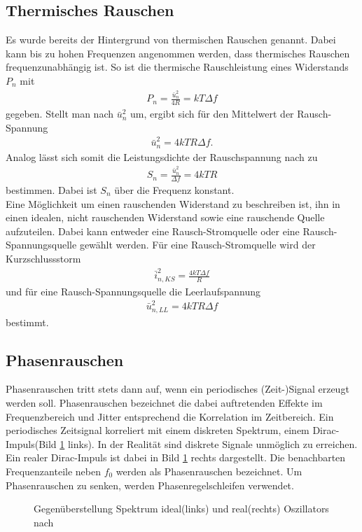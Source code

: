 \subsection{Thermisches Rauschen}
Es wurde bereits der Hintergrund von thermischen Rauschen genannt. Dabei kann bis zu hohen Frequenzen angenommen werden, dass thermisches Rauschen frequenzunabhängig ist. So ist die thermische Rauschleistung eines Widerstands $P_{n}$ mit
\begin{align}
P_{n} = \frac{\bar{u}_{n}^2}{4R} = kT\Delta f
\end{align}
gegeben. Stellt man nach $\bar{u}_{n}^2$ um, ergibt sich für den Mittelwert der Rausch-Spannung
\begin{align}
\bar{u}_{n}^2 = 4kTR\Delta f.
\end{align}
Analog lässt sich somit die Leistungsdichte der Rauschspannung nach \cite{Rauscherino} zu
\begin{align}
S_{n} = \frac{\bar{u}_{n}^2}{\Delta f} = 4kTR
\end{align}
bestimmen. Dabei ist $S_{n}$ über die Frequenz konstant. \\
Eine Möglichkeit um einen rauschenden Widerstand zu beschreiben ist, ihn in einen idealen, nicht rauschenden Widerstand sowie eine rauschende Quelle aufzuteilen. Dabei kann entweder eine Rausch-Stromquelle oder eine Rausch-Spannungsquelle gewählt werden. Für eine Rausch-Stromquelle wird der Kurzschlussstorm
\begin{align}
\bar{i}_{n,KS}^2 = \frac{4kT\Delta f}{R}
\end{align}
und für eine Rausch-Spannungsquelle die Leerlaufspannung
\begin{align}
\bar{u}_{n,LL}^2 = 4kTR\Delta f 
\end{align}
bestimmt\cite{HFKompo}.
\subsection{Phasenrauschen}
Phasenrauschen tritt stets dann auf, wenn ein periodisches (Zeit-)Signal erzeugt werden soll. Phasenrauschen bezeichnet die dabei auftretenden Effekte im Frequenzbereich und Jitter entsprechend die Korrelation im Zeitbereich. Ein periodisches Zeitsignal korreliert mit einem diskreten Spektrum, einem Dirac-Impuls(Bild \ref{Oszi} links). In der Realität sind diskrete Signale unmöglich zu erreichen. Ein realer Dirac-Impuls ist dabei in Bild \ref{Oszi} rechts dargestellt. Die benachbarten Frequenzanteile neben $f_{0}$ werden als Phasenrauschen bezeichnet. Um Phasenrauschen zu senken, werden Phasenregelschleifen verwendet.\\
\begin{figure}[tbp]
  \centering
  
  \caption{Gegenüberstellung Spektrum ideal(links) und real(rechts) Oszillators nach \cite{HFKompo}}
  \label{Oszi}
\end{figure}

